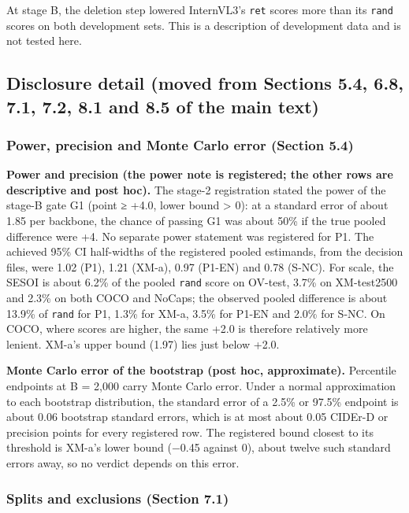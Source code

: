 At stage B, the deletion step lowered InternVL3's \texttt{ret} scores more than its \texttt{rand}
scores on both development sets. This is a description of development data and is not tested here.

\subsection{Disclosure detail (moved from Sections 5.4, 6.8, 7.1, 7.2, 8.1 and 8.5 of the main
text)}\label{disclosure-detail-moved-from-sections-5.4-6.8-7.1-7.2-8.1-and-8.5-of-the-main-text}

\subsubsection{Power, precision and Monte Carlo error (Section
5.4)}\label{power-precision-and-monte-carlo-error-section-5.4}

\textbf{Power and precision (the power note is registered; the other rows are descriptive and post
hoc).} The stage-2 registration stated the power of the stage-B gate G1 (point ≥ +4.0, lower bound
\textgreater{} 0): at a standard error of about 1.85 per backbone, the chance of passing G1 was
about 50\% if the true pooled difference were +4. No separate power statement was registered for P1.
The achieved 95\% CI half-widths of the registered pooled estimands, from the decision files, were
1.02 (P1), 1.21 (XM-a), 0.97 (P1-EN) and 0.78 (S-NC). For scale, the SESOI is about 6.2\% of the
pooled \texttt{rand} score on OV-test, 3.7\% on XM-test2500 and 2.3\% on both COCO and NoCaps; the
observed pooled difference is about 13.9\% of \texttt{rand} for P1, 1.3\% for XM-a, 3.5\% for P1-EN
and 2.0\% for S-NC. On COCO, where scores are higher, the same +2.0 is therefore relatively more
lenient. XM-a's upper bound (1.97) lies just below +2.0.

\textbf{Monte Carlo error of the bootstrap (post hoc, approximate).} Percentile endpoints at B =
2,000 carry Monte Carlo error. Under a normal approximation to each bootstrap distribution, the
standard error of a 2.5\% or 97.5\% endpoint is about 0.06 bootstrap standard errors, which is at
most about 0.05 CIDEr-D or precision points for every registered row. The registered bound closest
to its threshold is XM-a's lower bound (−0.45 against 0), about twelve such standard errors away, so
no verdict depends on this error.

\subsubsection{Splits and exclusions (Section 7.1)}\label{splits-and-exclusions-section-7.1}

